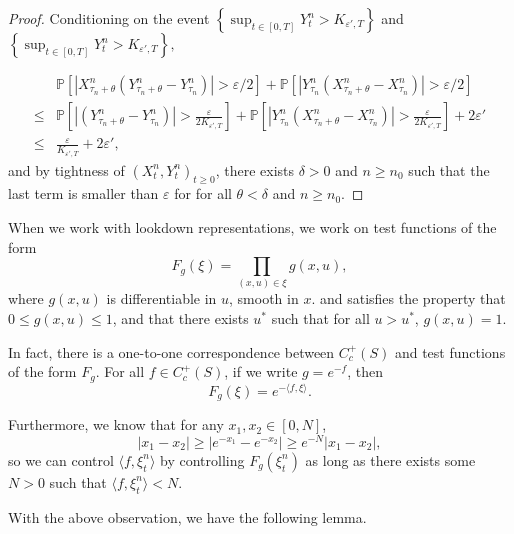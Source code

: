 \begin{proof}
Conditioning on the event $\left\{ \sup_{t\in [0,T]}Y^n_t > K_{\varepsilon',T} \right\}$ and $\left\{ \sup_{t\in [0,T]}Y^n_t > K_{\varepsilon',T} \right\},$

\begin{equation}
\begin{aligned}
& \mathbb{P}\left[|X^n_{\tau_n+\theta}(Y^n_{\tau_n+\theta}-Y^n_{\tau_n})|> \varepsilon/2 \right] + \mathbb{P}\left[ | Y^n_{\tau_n}( X^n_{\tau_n+\theta}- X^n_{\tau_n}) |> \varepsilon/2 \right]\\
\leq & \mathbb{P}\left[|(Y^n_{\tau_n+\theta}-Y^n_{\tau_n})|> \frac{\varepsilon}{2K_{\varepsilon',T}}\right] + \mathbb{P}\left[ | Y^n_{\tau_n}( X^n_{\tau_n+\theta}- X^n_{\tau_n}) |> \frac{\varepsilon}{2K_{\varepsilon',T}}\right] + 2 \varepsilon'\\
\leq & \frac{\varepsilon}{K_{\varepsilon',T}}+2 \varepsilon',
\end{aligned}
\end{equation}
and by tightness of $(X^n_t, Y^n_t)_{t \geq 0}$,
there exists $\delta > 0$ and $n \geq n_0$ such that the last term is smaller than $\varepsilon$ for 
for all $\theta < \delta$ and $n\geq n_0$.
\end{proof}


When we work with lookdown representations, we work on test functions of the form
\begin{equation}
F_g(\xi) = \prod_{(x,u) \in \xi} g(x,u),
\end{equation}
where $g(x,u)$ is differentiable in $u$, smooth in $x$.
and satisfies the property that $0\leq g(x,u) \leq 1$,
and that there exists $u^*$ such that for all $u > u^*$,
$g(x, u) =1$.

In fact, there is a one-to-one correspondence between $C^{+}_c(S)$
and test functions of the form $F_g$.
For all $f \in C^{+}_c(S)$,
if we write $g = e^{-f}$,
then
\begin{equation}
F_g(\xi)= e^{-\langle f, \xi \rangle}.
\end{equation}

Furthermore,
we know that for any $x_1, x_2 \in [0,N]$,
$$|x_1-x_2|\geq |e^{-x_1}-e^{-x_2}| \geq e^{-N}|x_1-x_2|,$$
so we can control $\langle f, \xi^n_t \rangle $ by controlling $F_g(\xi^n_t)$ as long as 
there exists some $N > 0$ such that $\langle f, \xi^n_t \rangle < N$.

With the above observation,
we have the following lemma.

